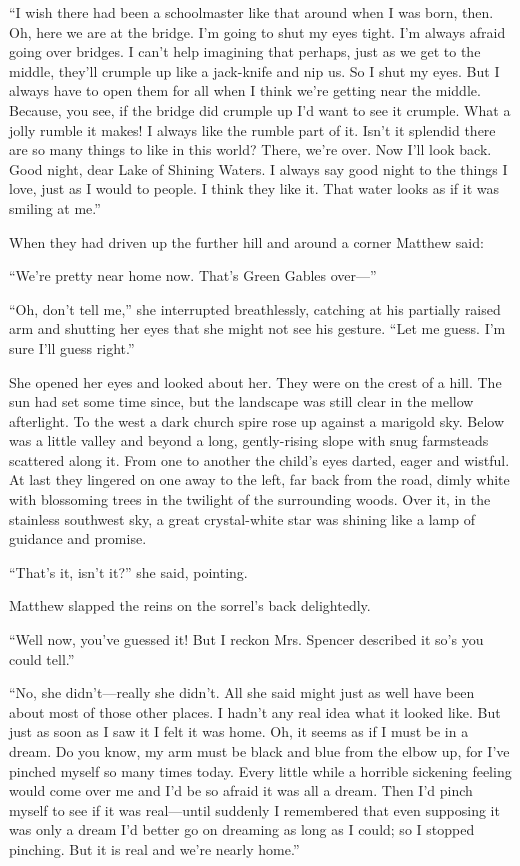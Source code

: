 \documentclass[a4paper]{article}
\begin{document}
\normalsize{``I wish there had been a schoolmaster like that around when I was born, then. Oh, here we are at the bridge. I'm going to shut my eyes tight. I'm always afraid going over bridges. I can't help imagining that perhaps, just as we get to the middle, they'll crumple up like a jack-knife and nip us. So I shut my eyes. But I always have to open them for all when I think we're getting near the middle. Because, you see, if the bridge did crumple up I'd want to see it crumple. What a jolly rumble it makes! I always like the rumble part of it. Isn't it splendid there are so many things to like in this world? There, we're over. Now I'll look back. Good night, dear Lake of Shining Waters. I always say good night to the things I love, just as I would to people. I think they like it. That water looks as if it was smiling at me.''}

\large{When they had driven up the further hill and around a corner Matthew said:

``We're pretty near home now. That's Green Gables over---''

``Oh, don't tell me,'' she interrupted breathlessly, catching at his partially raised arm and shutting her eyes that she might not see his gesture. ``Let me guess. I'm sure I'll guess right.''}

\Large{She opened her eyes and looked about her. They were on the crest of a hill. The sun had set some time since, but the landscape was still clear in the mellow afterlight. To the west a dark church spire rose up against a marigold sky. Below was a little valley and beyond a long, gently-rising slope with snug farmsteads scattered along it. From one to another the child's eyes darted, eager and wistful. At last they lingered on one away to the left, far back from the road, dimly white with blossoming trees in the twilight of the surrounding woods. Over it, in the stainless southwest sky, a great crystal-white star was shining like a lamp of guidance and promise.}

\LARGE{``That's it, isn't it?'' she said, pointing.

Matthew slapped the reins on the sorrel's back delightedly.

``Well now, you've guessed it! But I reckon Mrs. Spencer described it so's you could tell.''}

\huge{``No, she didn't---really she didn't. All she said might just as well have been about most of those other places. I hadn't any real idea what it looked like. But just as soon as I saw it I felt it was home. Oh, it seems as if I must be in a dream. Do you know, my arm must be black and blue from the elbow up, for I've pinched myself so many times today. Every little while a horrible sickening feeling would come over me and I'd be so afraid it was all a dream. Then I'd pinch myself to see if it was real---until suddenly I remembered that even supposing it was only a dream I'd better go on dreaming as long as I could; so I stopped pinching. But it is real and we're nearly home.''}
\end{document}
